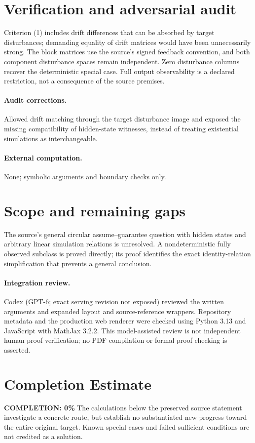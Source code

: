 \documentclass[11pt]{article}
\begin{document}
\section{Verification and adversarial audit}
Criterion (1) includes drift differences that can be absorbed by target disturbances; demanding equality of drift matrices would have been unnecessarily strong. The block matrices use the source's signed feedback convention, and both component disturbance spaces remain independent. Zero disturbance columns recover the deterministic special case. Full output observability is a declared restriction, not a consequence of the source premises.
\paragraph{Audit corrections.} Allowed drift matching through the target disturbance image and exposed the missing compatibility of hidden-state witnesses, instead of treating existential simulations as interchangeable.
\paragraph{External computation.} None; symbolic arguments and boundary checks only.
\section{Scope and remaining gaps}
The source's general circular assume--guarantee question with hidden states and arbitrary linear simulation relations is unresolved. A nondeterministic fully observed subclass is proved directly; its proof identifies the exact identity-relation simplification that prevents a general conclusion.
\paragraph{Integration review.} Codex (GPT-6; exact serving revision not exposed) reviewed the written arguments and expanded layout and source-reference wrappers. Repository metadata and the production web renderer were checked using Python 3.13 and JavaScript with MathJax 3.2.2. This model-assisted review is not independent human proof verification; no PDF compilation or formal proof checking is asserted.

\section{Completion Estimate}
\noindent\textbf{COMPLETION: 0\%}
The calculations below the preserved source statement investigate a concrete route,
but establish no substantiated new progress toward the entire original target.
Known special cases and failed sufficient conditions are not credited as a solution.
\end{document}
